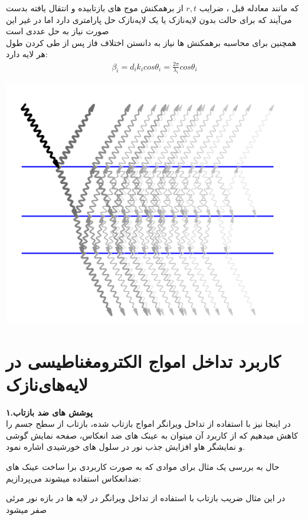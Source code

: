 \documentclass{article}
\begin{document}
	که مانند معادله قبل ، ضرایب $r,t$  از برهمکنش موج های بازتابیده و انتقال یافته بدست می‌آیند که برای حالت بدون لایه‌نازک یا یک لایه‌نازک حل پارامتری دارد اما در غیر این صورت نیاز به حل عددی است
	\\
	همچنین برای محاسبه برهمکنش ها نیاز به دانستن اختلاف فاز پس از طی کردن طول هر لایه دارد:
	\begin{gather*}
		\beta_i=d_ik_icos\theta_i=\frac{2\pi}{\lambda_i}cos\theta_i
	\end{gather*}
	
	\begin{center}
		\includegraphics[height=.45\linewidth]{wAN1K}
	\end{center}
	\newpage	

	
	\section*{کاربرد تداخل امواج الکترومغناطیسی در لایه‌های‌نازک}
	\textbf{۱.پوشش های ضد بازتاب}
	\\
	
	در اینجا نیز با استفاده از تداخل ویرانگر امواج بازتاب شده، بازتاب از سطح جسم را کاهش میدهیم که از کاربرد آن میتوان به عینک های ضد انعکاس، صفحه نمایش گوشی و نمایشگر هاو افزایش جذب نور در سلول های خورشیدی اشاره نمود.
	
	حال به بررسی یک مثال برای موادی که به صورت کاربردی برا ساخت عینک های ضدانعکاس استفاده میشوند می‌پردازیم:
	
	در این مثال ضریب بازتاب با استفاده از تداخل ویرانگر در لایه ها در بازه نور مرئی صفر میشود
	
\end{document}
